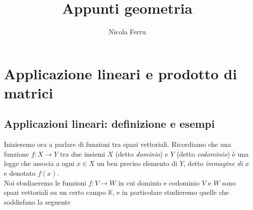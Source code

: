 \message{ !name(algebraegeometria.tex)}\documentclass{book}
\title{Appunti geometria}
\author{Nicola Ferru}
\begin{document}

\maketitle
\tableofcontents
\listoftables
\listoffigures





\chapter{Applicazione lineari e prodotto di matrici}
\section{Applicazioni lineari: definizione e esempi\label{applin}}
Inizieremo ora a parlare di funzioni tra spazi vettoriali. Ricordiamo che una funzione $f:X\to Y$ tra due insiemi
$X$ (detto \textit{dominio}) e $Y$ (detto \textit{codominio}) è una legge che associa a ogni $x\in X$ un ben
preciso elemento di $Y$, detto \textit{immagine di $x$} e denotato $f(x)$.\\
Noi studiaeremo le funzioni $f:V\to W$ in cui dominio e codominio $V$ e $W$ sono spazi vettoriali su un certo
campo $\mathds{K}$, e in particolare studieremo quelle che soddisfano la seguente
\end{document}
